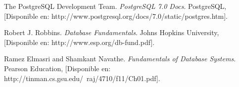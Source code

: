\documentclass[spanish,12pt,letterpapper]{article}
\begin{document}
	
	\pagebreak
	\begin{thebibliography}{9}	
	
	 The PostgreSQL Development Team. 
		\emph{PostgreSQL 7.0 Docs}. PostgreSQL, [Disponible en: http://www.postgresql.org/docs/7.0/static/postgres.htm].
	
		 Robert J. Robbins. 
		\emph{Database Fundamentals}. Johns Hopkins University, [Disponible en: http://www.esp.org/db-fund.pdf].
		
		 Ramez Elmasri and Shamkant Navathe. 
		\emph{Fundamentals of Database Systems}. Pearson Education, [Disponible en: http://tinman.cs.gsu.edu/~raj/4710/f11/Ch01.pdf].

	\end{thebibliography}
\end{document}
